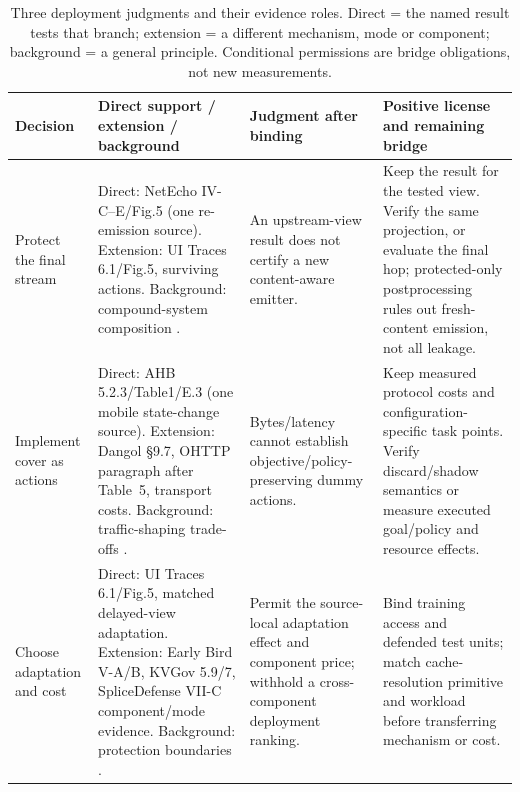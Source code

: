 \begin{table}[t]\centering\footnotesize
\caption{Three deployment judgments and their evidence roles. Direct = the named result tests that branch; extension = a different mechanism, mode or component; background = a general principle. Conditional permissions are bridge obligations, not new measurements.}\label{tab:synthesis-decisions}
\begin{tabularx}{\textwidth}{@{}p{}p{}YY@{}}\toprule
Decision & Direct support / extension / background & Judgment after binding & Positive license and remaining bridge\\\midrule
Protect the final stream & Direct: NetEcho IV-C--E/Fig.5 (one re-emission source). Extension: UI Traces 6.1/Fig.5, surviving actions. Background: compound-system composition \cite{banerjee2024compound}. & An upstream-view result does not certify a new content-aware emitter. & Keep the result for the tested view. Verify the same projection, or evaluate the final hop; protected-only postprocessing rules out fresh-content emission, not all leakage.\\
Implement cover as actions & Direct: AHB 5.2.3/Table1/E.3 (one mobile state-change source). Extension: Dangol \S9.7, OHTTP paragraph after Table~5, transport costs. Background: traffic-shaping trade-offs \cite{cai2014systematic}. & Bytes/latency cannot establish objective/policy-preserving dummy actions. & Keep measured protocol costs and configuration-specific task points. Verify discard/shadow semantics or measure executed goal/policy and resource effects.\\
Choose adaptation and cost & Direct: UI Traces 6.1/Fig.5, matched delayed-view adaptation. Extension: Early Bird V-A/B, KVGov 5.9/7, SpliceDefense VII-C component/mode evidence. Background: protection boundaries \cite{forough2026secrets}. & Permit the source-local adaptation effect and component price; withhold a cross-component deployment ranking. & Bind training access and defended test units; match cache-resolution primitive and workload before transferring mechanism or cost.\\\bottomrule
\end{tabularx}\end{table}
